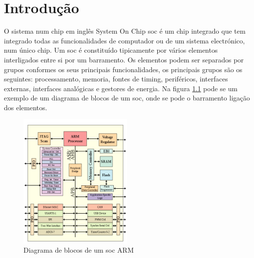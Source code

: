 
\chapter{Introdu\c{c}\~ao}
\label{chapter:introducao}

O sistema num chip em inglês System On Chip \acrlong{soc} é um chip integrado que tem integrado todas as funcionalidades de computador ou de um sistema electrónico, num único chip. Um \acrshort{soc} é constituído tipicamente por vários elementos interligados entre si por um barramento. Os elementos podem ser separados por grupos conformes os seus principais funcionalidades, os principais grupos são os seguintes: processamento, memoria, fontes de \textcolor[rgb]{1,0,0}{timing}, periféricos, interfaces externas, interfaces analógicas e gestores de energia. Na figura \ref{figures:ARM} pode se um exemplo de um diagrama de blocos de um \acrshort{soc}, onde se pode o barramento ligação dos elementos.


\begin{figure}[!htb]
  \centering
  \includegraphics[width=0.5\textwidth]{Figures/ARM_SOC.png}
  \caption[Diagrama de blocos de um soc ARM ]{Diagrama de blocos de um soc ARM }
  \label{figures:ARM}
\end{figure}

